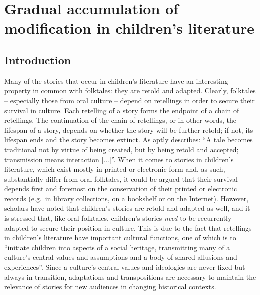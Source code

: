 
\chapter[Gradual Accumulation of Modification]{Gradual accumulation of modification in children's literature}\label{chp:red-riding-hood}


\section{Introduction}\label{sec:introduction}

Many of the stories that occur in children's literature have an interesting property in common with folktales: they are retold and adapted. Clearly, folktales -- especially those from oral culture -- depend on retellings in order to secure their survival in culture. Each retelling of a story forms the endpoint of a chain of retellings. The continuation of the chain of retellings, or in other words, the lifespan of a story, depends on whether the story will be further retold; if not, its lifespan ends and the story becomes extinct. As \citeauthor{burkert:1982} aptly describes: ``A tale becomes traditional not by virtue of being created, but by being retold and accepted; transmission means interaction [...]''\autocite[2]{burkert:1982}. When it comes to stories in children's literature, which exist mostly in printed or electronic form and, as such, substantially differ from oral folktales, it could be argued that their survival depends first and foremost on the conservation of their printed or electronic records (e.g.\ in library collections, on a bookshelf or on the Internet). However, scholars have noted that children's stories are retold and adapted as well, and it is stressed that, like oral folktales, children's stories \emph{need} to be recurrently adapted to secure their position in culture\autocite{stephens_mccallum,collins_ridgman,geerts:2014}. This is due to the fact that retellings in children's literature have important cultural functions, one of which is to ``initiate children into aspects of a social heritage, transmitting many of a culture's central values and assumptions and a body of shared allusions and experiences''\autocite[3]{stephens_mccallum}. Since a culture's central values and ideologies are never fixed but always in transition, adaptations and transpositions are necessary to maintain the relevance of stories for new audiences in changing historical contexts\autocite{collins_ridgman}. 

